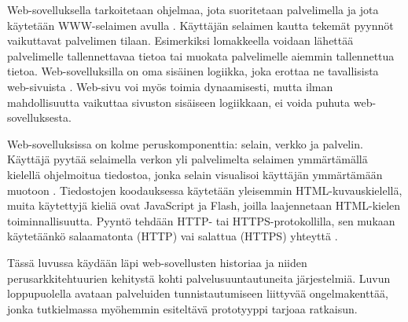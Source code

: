 Web-sovelluksella tarkoitetaan ohjelmaa, jota suoritetaan palvelimella ja jota käytetään WWW-selaimen avulla \cite{uml}. Käyttäjän selaimen kautta tekemät pyynnöt vaikuttavat palvelimen tilaan. Esimerkiksi lomakkeella voidaan lähettää palvelimelle tallennettavaa tietoa tai muokata palvelimelle aiemmin tallennettua tietoa. Web-sovelluksilla on oma sisäinen logiikka, joka erottaa ne tavallisista web-sivuista \cite{uml}. Web-sivu voi myös toimia dynaamisesti, mutta ilman mahdollisuutta vaikuttaa sivuston sisäiseen logiikkaan, ei voida puhuta web-sovelluksesta.

Web-sovelluksissa on kolme peruskomponenttia: selain, verkko ja palvelin. Käyttäjä pyytää selaimella verkon yli palvelimelta selaimen ymmärtämällä kielellä ohjelmoitua tiedostoa, jonka selain visualisoi käyttäjän ymmärtämään muotoon \cite{uml}. Tiedostojen koodauksessa käytetään yleisemmin HTML-kuvauskielellä, muita käytettyjä kieliä ovat JavaScript ja Flash, joilla laajennetaan HTML-kielen toiminnallisuutta. Pyyntö tehdään HTTP- tai HTTPS-protokollilla, sen mukaan käytetäänkö salaamatonta (HTTP) vai salattua (HTTPS) yhteyttä \cite{rfc2818}.

Tässä luvussa käydään läpi web-sovellusten historiaa ja niiden perusarkkitehtuurien kehitystä kohti palvelusuuntautuneita järjestelmiä. Luvun loppupuolella avataan palveluiden tunnistautumiseen liittyvää ongelmakenttää, jonka tutkielmassa myöhemmin esiteltävä prototyyppi tarjoaa ratkaisun.